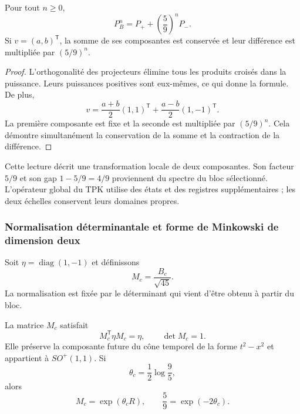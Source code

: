 \begin{proposicion}
\label{geo:prop-markov}
Pour tout $n\geq0$,
\[
 P_B^n=P_++\left(\frac59\right)^nP_-.
\]
Si $v=(a,b)^{\mathsf T}$, la somme de ses composantes est conservée et leur différence est multipliée par $(5/9)^n$.
\end{proposicion}

\begin{proof}
L'orthogonalité des projecteurs élimine tous les produits croisés dans la puissance. Leurs puissances positives sont eux-mêmes, ce qui donne la formule. De plus,
\[
 v=\frac{a+b}{2}(1,1)^{\mathsf T}
   +\frac{a-b}{2}(1,-1)^{\mathsf T}.
\]
La première composante est fixe et la seconde est multipliée par $(5/9)^n$. Cela démontre simultanément la conservation de la somme et la contraction de la différence.
\end{proof}

Cette lecture décrit une transformation locale de deux composantes. Son facteur $5/9$ et son gap $1-5/9=4/9$ proviennent du spectre du bloc sélectionné. L'opérateur global du TPK utilise des états et des registres supplémentaires ; les deux échelles conservent leurs domaines propres.

\subsubsection{Normalisation déterminantale et forme de Minkowski de dimension deux}

Soit $\eta=\operatorname{diag}(1,-1)$ et définissons
\[
 M_c=\frac{B_c}{\sqrt{45}}.
\]
La normalisation est fixée par le déterminant qui vient d'être obtenu à partir du bloc.

\begin{teorema}
\label{geo:thm-lorentz}
La matrice $M_c$ satisfait
\[
 M_c^{\mathsf T}\eta M_c=\eta,
 \qquad \det M_c=1.
\]
Elle préserve la composante future du cône temporel de la forme $t^2-x^2$ et appartient à $SO^+(1,1)$. Si
\[
 \theta_c=\frac12\log\frac95,
\]
alors
\[
 M_c=\exp(\theta_cR),\qquad
 \frac59=\exp(-2\theta_c).
\]
\end{teorema}

